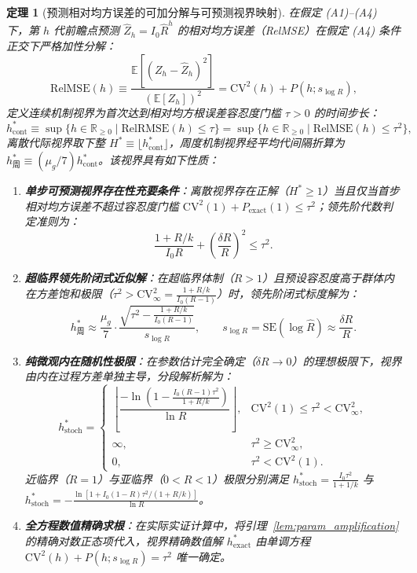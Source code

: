 \documentclass[11pt,a4paper]{article}
\theoremstyle{plain}
\newtheorem{theorem}{定理}
\theoremstyle{definition}
\begin{document}
\begin{theorem}[预测相对均方误差的可加分解与可预测视界映射]\label{thm:horizon}
在假定 (A1)--(A4) 下，第 $h$ 代前瞻点预测 $\hat{Z}_h = I_0 \hat{R}^h$ 的相对均方误差（RelMSE）在假定 (A4) 条件正交下严格加性分解：
\begin{equation}
\text{RelMSE}(h) \equiv \frac{\mathbb{E}[(Z_h - \hat{Z}_h)^2]}{(\mathbb{E}[Z_h])^2} = \text{CV}^2(h) + P(h; s_{\log R}),
\label{eq:relmse_decomp}
\end{equation}
定义连续机制视界为首次达到相对均方根误差容忍度门槛 $\tau > 0$ 的时间步长：
\begin{equation}
h^*_{\text{cont}} \equiv \sup\{h \in \mathbb{R}_{\ge 0} \mid \text{RelRMSE}(h) \le \tau\} = \sup\{h \in \mathbb{R}_{\ge 0} \mid \text{RelMSE}(h) \le \tau^2\},
\end{equation}
离散代际视界取下整 $H^* \equiv \lfloor h^*_{\text{cont}} \rfloor$，周度机制视界经平均代间隔折算为 $h^*_{\text{周}} \equiv (\mu_g/7) h^*_{\text{cont}}$。该视界具有如下性质：
\begin{enumerate}
\item \textbf{单步可预测视界存在性充要条件}：离散视界存在正解（$H^* \ge 1$）当且仅当首步相对均方误差不超过容忍度门槛 $\text{CV}^2(1) + P_{\text{exact}}(1) \le \tau^2$；领先阶代数判定准则为：
\begin{equation}
\frac{1 + R/k}{I_0 R} + \left(\frac{\delta R}{R}\right)^2 \le \tau^2.
\label{eq:h_exist_cond}
\end{equation}
\item \textbf{超临界领先阶闭式近似解}：在超临界体制（$R > 1$）且预设容忍度高于群体内在方差饱和极限（$\tau^2 > \text{CV}^2_\infty = \frac{1+R/k}{I_0(R-1)}$）时，领先阶闭式标度解为：
\begin{equation}
h^*_{\text{周}} \approx \frac{\mu_g}{7} \cdot \frac{\sqrt{\tau^2 - \frac{1 + R/k}{I_0(R - 1)}}}{s_{\log R}}, \qquad s_{\log R} = \text{SE}(\log \hat{R}) \approx \frac{\delta R}{R}.
\label{eq:horizon_cn}
\end{equation}
\item \textbf{纯微观内在随机性极限}：在参数估计完全确定（$\delta R \to 0$）的理想极限下，视界由内在过程方差单独主导，分段解析解为：
\begin{equation}
h^*_{\text{stoch}} = \begin{cases}
\left\lfloor \dfrac{-\ln\left(1 - \frac{I_0(R - 1)\tau^2}{1 + R/k}\right)}{\ln R} \right\rfloor, & \text{CV}^2(1) \le \tau^2 < \text{CV}^2_\infty, \\[6pt]
\infty, & \tau^2 \ge \text{CV}^2_\infty, \\[4pt]
0, & \tau^2 < \text{CV}^2(1).
\end{cases}
\label{eq:h_stoch_bound}
\end{equation}
近临界（$R=1$）与亚临界（$0<R<1$）极限分别满足 $h^*_{\text{stoch}} = \frac{I_0\tau^2}{1+1/k}$ 与 $h^*_{\text{stoch}} = -\frac{\ln[1+I_0(1-R)\tau^2/(1+R/k)]}{\ln R}$。
\item \textbf{全方程数值精确求根}：在实际实证计算中，将引理~\ref{lem:param_amplification} 的精确对数正态项代入，视界精确数值解 $h^*_{\text{exact}}$ 由单调方程 $\text{CV}^2(h) + P(h; s_{\log R}) = \tau^2$ 唯一确定。
\end{enumerate}
\end{theorem}
\end{document}
